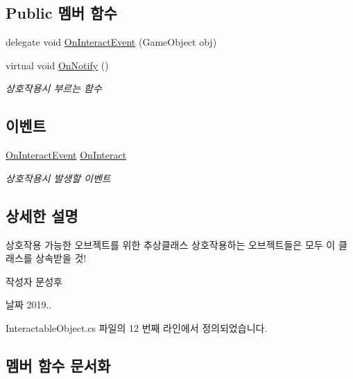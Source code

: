 \subsection*{Public 멤버 함수}
\begin{DoxyCompactItemize}
\item 
delegate void \mbox{\hyperlink{class_interactable_object_a70a579e4b09d53e6cb77b5222189d5eb}{On\+Interact\+Event}} (Game\+Object obj)
\item 
virtual void \mbox{\hyperlink{class_interactable_object_aa5c752d17471fe0daf58a4d00c218a29}{On\+Notify}} ()
\begin{DoxyCompactList}\small\item\em 상호작용시 부르는 함수 \end{DoxyCompactList}\end{DoxyCompactItemize}
\subsection*{이벤트}
\begin{DoxyCompactItemize}
\item 
\mbox{\hyperlink{class_interactable_object_a70a579e4b09d53e6cb77b5222189d5eb}{On\+Interact\+Event}} \mbox{\hyperlink{class_interactable_object_afe5e0b16d86c2ed4abf4a71a1995f7ae}{On\+Interact}}
\begin{DoxyCompactList}\small\item\em 상호작용시 발생할 이벤트 \end{DoxyCompactList}\end{DoxyCompactItemize}


\subsection{상세한 설명}
상호작용 가능한 오브젝트를 위한 추상클래스 상호작용하는 오브젝트들은 모두 이 클래스를 상속받을 것! 

\begin{DoxyAuthor}{작성자}
문성후 
\end{DoxyAuthor}
\begin{DoxyDate}{날짜}
2019.. 
\end{DoxyDate}


Interactable\+Object.\+cs 파일의 12 번째 라인에서 정의되었습니다.



\subsection{멤버 함수 문서화}
\mbox{\label{class_interactable_object_a70a579e4b09d53e6cb77b5222189d5eb}} 

